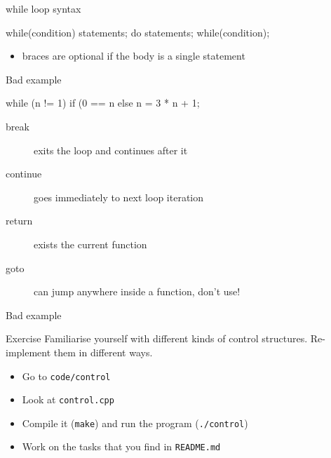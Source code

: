 \begin{frame}[fragile]
  \begin{block}{while loop syntax}
    \begin{cppcode*}{}
      while(condition) {
        statements;
      }
      do {
        statements;
      } while(condition);
    \end{cppcode*}
    \begin{itemize}
      \item braces are optional if the body is a single statement
    \end{itemize}
  \end{block}
  \pause
  \begin{alertblock}{Bad example}
    \begin{cppcode*}{}
      while (n != 1)
        if (0 == n%
        else n = 3 * n + 1;
    \end{cppcode*}
  \end{alertblock}
\end{frame}

\begin{frame}[fragile]
  \begin{block}{}
    \begin{description}
    \item[break] exits the loop and continues after it
    \item[continue] goes immediately to next loop iteration
    \item[return] exists the current function
    \item[goto] can jump anywhere inside a function, don't use!
    \end{description}
  \end{block}
  \pause
  \begin{alertblock}{Bad example}
  \end{alertblock}
\end{frame}

\begin{frame}[fragile]
  \begin{alertblock}{Exercise}
    Familiarise yourself with different kinds of control structures. Re-implement them in different ways.
    \begin{itemize}
      \item Go to \texttt{code/control}
      \item Look at \texttt{control.cpp}
      \item Compile it (\texttt{make}) and run the program (\texttt{./control})
      \item Work on the tasks that you find in \texttt{README.md}
    \end{itemize}
  \end{alertblock}
\end{frame}
